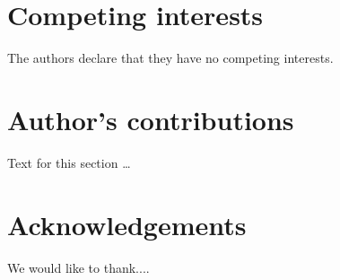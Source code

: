 \documentclass{bmcart}
\begin{document}


\begin{backmatter}

\section*{Competing interests}
  The authors declare that they have no competing interests.

\section*{Author's contributions}
    Text for this section \ldots

\section*{Acknowledgements}
  We would like to thank....
  
  



\end{backmatter}
\end{document}
